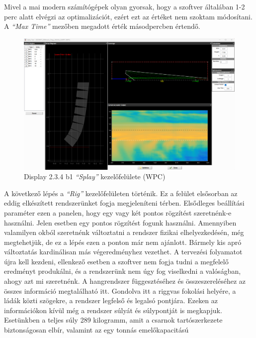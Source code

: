 Mivel a mai modern számítógépek olyan gyorsak, hogy a szoftver általában 1-2 perc alatt elvégzi az optimalizációt, ezért ezt az értéket
nem szoktam módosítani. A \textit{``Max Time''} mezőben megadott érték másodpercben értendő.
\begin{figure}[H]
	\centering
	\includegraphics[width=\textwidth, keepaspectratio]{figures/display_wpc_3.png}
	\caption{Display 2.3.4 b1 \textit{``Splay''} kezelőfelülete (WPC)}\label{fig:display_wpc_3}
\end{figure}
A következő lépés a \textit{``Rig''} kezelőfelületen történik. Ez a felület elsősorban az eddig elkészített
rendszerünket fogja megjeleníteni térben. Elsődleges beállítási paraméter ezen a panelen, hogy egy vagy két pontos
rögzítést szeretnénk-e használni. Jelen esetben egy pontos  rögzítést fogunk használni. Amennyiben valamilyen okból
szeretnénk változtatni a rendszer fizikai elhelyezkedésén, még megtehetjük, de ez a lépés ezen a ponton már nem ajánlott.
Bármely kis apró változtatás kardinálisan más végeredményhez vezethet. A tervezési folyamatot újra kell kezdeni, ellenkező esetben
a szoftver nem fogja tudni a megfelelő eredményt produkálni, és a rendszerünk nem úgy fog viselkedni a valóságban, ahogy azt mi szeretnénk.
A hangrendszer függesztéséhez és összeszereléséhez az összes információ megtalálható itt. Gondolva itt a riggvas fokolási helyére,
a ládák közti szögekre, a rendszer legfelső és legalsó pontjára.
Ezeken az információkon kívül még a rendszer súlyát és súlypontját is megkapjuk.
Esetünkben a teljes súly 289 kilogramm, amit a csarnok tartószerkezete biztonságosan elbír, valamint az egy tonnás emelőkapacitású
